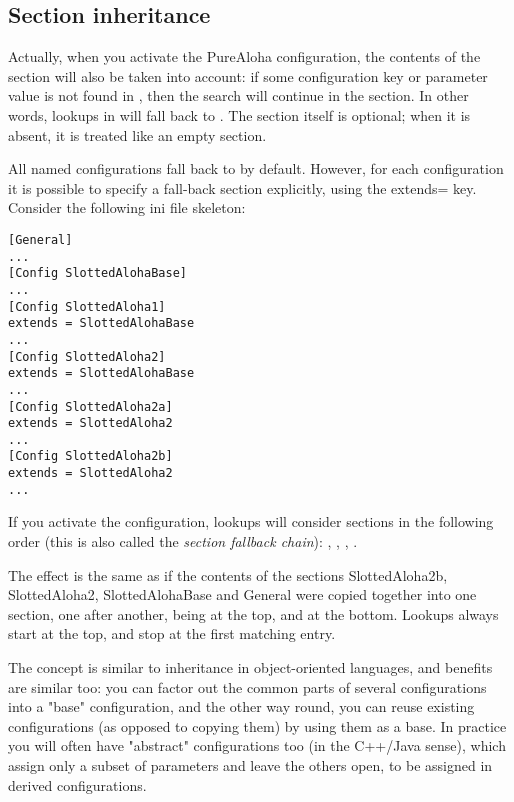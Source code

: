 \subsection{Section inheritance}

Actually, when you activate the PureAloha configuration, the contents of
the \ttt{[General]} section will also be taken into account: if some
configuration key or parameter value is not found in ,
then the search will continue in the \ttt{[General]} section. In
other words, lookups in  will fall back to \ttt{[General]}.
The \ttt{[General]} section itself is optional; when it is absent, it is
treated like an empty \ttt{[General]} section.

All named configurations fall back to \ttt{[General]} by default. However, for
each configuration it is possible to specify a fall-back section
explicitly, using the extends= key. Consider the following ini file
skeleton:

\begin{Verbatim}[commandchars=\\\{\}]
[General]
...
[Config SlottedAlohaBase]
...
[Config SlottedAloha1]
extends = SlottedAlohaBase
...
[Config SlottedAloha2]
extends = SlottedAlohaBase
...
[Config SlottedAloha2a]
extends = SlottedAloha2
...
[Config SlottedAloha2b]
extends = SlottedAloha2
...
\end{Verbatim}


If you activate the  configuration, lookups will consider
sections in the following order (this is also called the
\textit{section fallback chain}): ,
, , .

The effect is the same as if the contents of the sections
SlottedAloha2b, SlottedAloha2, SlottedAlohaBase and General were copied
together into one section, one after another, 
being at the top, and \ttt{[General]} at the bottom. Lookups always start at
the top, and stop at the first matching entry.

The concept is similar to inheritance in object-oriented languages,
and benefits are similar too: you can factor out the common parts of
several configurations into a "base"
configuration, and the other way round, you can reuse existing
configurations (as opposed to copying them) by using them as a base. In
practice you will often have "abstract"
configurations too (in the C++/Java sense), which assign only a subset
of parameters and leave the others open, to be assigned in derived
configurations.

